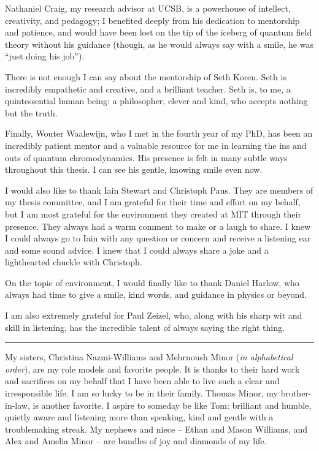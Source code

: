 Nathaniel Craig, my research advisor at UCSB, is a powerhouse of intellect, creativity, and pedagogy;
%
I benefited deeply from his dedication to mentorship and patience, and would have been lost on the tip of the iceberg of quantum field theory without his guidance (though, as he would always say with a smile, he was ``just doing his job'').



There is not enough I can say about the mentorship of Seth Koren.
%
Seth is incredibly empathetic and creative, and a brilliant teacher.
%
Seth is, to me, a quintessential human being:
%
a philosopher, clever and kind, who accepts nothing but the truth.



Finally, Wouter Waalewijn, who I met in the fourth year of my PhD, has been an incredibly patient mentor and a valuable resource for me in learning the ins and outs of quantum chromodynamics.
%
His presence is felt in many subtle ways throughout this thesis.
%
I can see his gentle, knowing smile even now.



I would also like to thank Iain Stewart and Christoph Paus.
%
They are members of my thesis committee, and I am grateful for their time and effort on my behalf, but I am most grateful for the environment they created at MIT through their presence.
%
They always had a warm comment to make or a laugh to share.
%
I knew I could always go to Iain with any question or concern and receive a listening ear and some sound advice.
%
I knew that I could always share a joke and a lighthearted chuckle with Christoph.


On the topic of environment, I would finally like to thank Daniel Harlow, who always had time to give a smile, kind words, and guidance in physics or beyond.

I am also extremely grateful for Paul Zeizel, who, along with his sharp wit and skill in listening, has the incredible talent of always saying the right thing.

\vspace{12pt}
\hrule
\vspace{12pt}


My sisters, Christina Nazmi-Williams and Mehrnoush Minor (\textit{in alphabetical order}), are my role models and favorite people.
%
It is thanks to their hard work and sacrifices on my behalf that I have been able to live such a clear and irresponsible life.
%
I am so lucky to be in their family.
%
Thomas Minor, my brother-in-law, is another favorite.
%
I aspire to someday be like Tom:
%
brilliant and humble, quietly aware and listening more than speaking, kind and gentle with a troublemaking streak.
%
My nephews and niece -- Ethan and Mason Williams, and Alex and Amelia Minor -- are bundles of joy and diamonds of my life.




